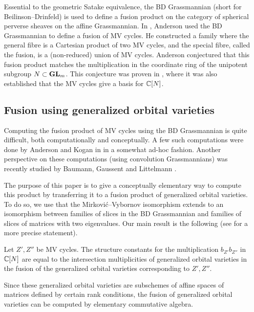 \documentclass{article}
\begin{document}
Essential to the geometric Satake equivalence, the BD Grassmannian (short for Beilinson--Drinfeld) is used to define a fusion product on the category of spherical perverse sheaves on the affine Grassmannian.  In \cite{anderson2003polytope}, Anderson used the BD Grassmannian to define a fusion of MV cycles.  He constructed a family where the general fibre is a Cartesian product of two MV cycles, and the special fibre, called the fusion, is a (non-reduced) union of MV cycles.  Anderson conjectured that this fusion product matches the multiplication in the coordinate ring of the unipotent subgroup $ N \subset{\mathbf{GL}}_m$.  This conjecture was proven in \cite{baumann2019mirkovic}, where it was also established that the MV cycles give a basis for $ \mathbb C[N]$.


\subsection{Fusion using generalized orbital varieties}
\label{ss:fugov}
% 
Computing the fusion product of MV cycles using the BD Grassmannian is quite difficult, both computationally and conceptually.  A few such computations were done by Anderson and Kogan in \cite{anderson2006algebra} in a somewhat ad-hoc fashion.  Another perspective on these computations (using convolution Grassmannians) was recently studied by Baumann, Gaussent and Littelmann \cite{baumann2020bases}.

The purpose of this paper is to give a conceptually elementary way to compute this product by transferring it to a fusion product of generalized orbital varieties.  To do so, we use that the Mirkovi\'c--Vybornov isomorphism extends to an isomorphism between families of slices in the BD Grassmannian and families of slices of matrices with two eigenvalues. Our main result is the following (see  for a more precise statement).

\begin{theorem}
    Let $ Z', Z'' $ be MV cycles.  The structure constants for the multiplication $ b_{Z'} b_{Z''}$ in $\mathbb C[N]$ are equal to the intersection multiplicities of generalized orbital varieties in the fusion of the generalized orbital varieties corresponding to $ Z', Z''$.
\end{theorem}

Since these generalized orbital varieties are subschemes of affine spaces of matrices defined by certain rank conditions, the fusion of generalized orbital varieties can be computed by elementary commutative algebra.
\end{document}
